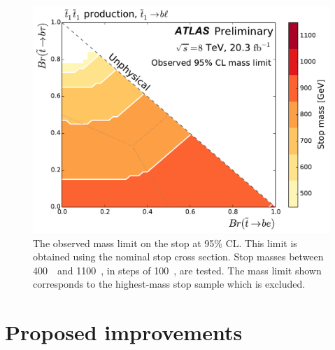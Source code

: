 \begin{figure}[ht]
  \centering
  \includegraphics[width=\textwidth]
    {figs/blstop/mass_limit_contours_no_extras_obs.pdf}
  \caption{The observed mass limit on the stop at 95\% CL.
    This limit is obtained using the nominal stop cross section.
    Stop masses between 400~\GeV\ and 1100~\GeV, in steps of 100~\GeV, are
    tested.
    The mass limit shown corresponds to the highest-mass stop sample which is
    excluded.
  }
  \label{fig:mass_limit_obs}
\end{figure}

\FloatBarrier
\section{Proposed improvements}
\label{sec:improvements}

